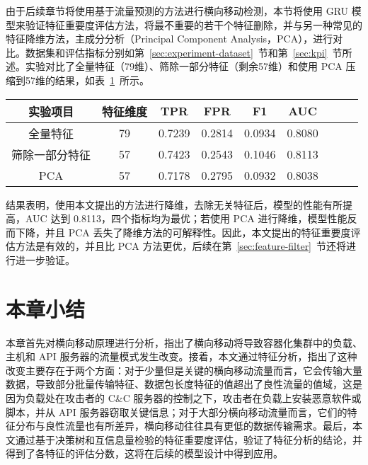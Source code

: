{由于后续章节将使用基于流量预测的方法进行横向移动检测，本节将使用 GRU 模型来验证特征重要度评估方法，将最不重要的若干个特征删除，并与另一种常见的特征降维方法，主成分分析（Principal Component Analysis，PCA），进行对比。数据集和评估指标分别如第~\ref{sec:experiment-dataset}~节和第~\ref{sec:kpi}~节所述。实验对比了全量特征（79维）、筛除一部分特征（剩余57维）和使用 PCA 压缩到57维的结果，如表~\ref{tab:analyze-expreiment-result}~所示。

\begin{table}[!htbp]
    \label{tab:analyze-expreiment-result}
    \centering
    \footnotesize%
    \setlength{\tabcolsep}{4pt}%
    \renewcommand{\arraystretch}{1.2}%
    \begin{tabular}{ccccccccc}
        \hline
        实验项目 & 特征维度 & TPR & FPR & F1 & AUC\\
        \hline
        全量特征 & 79 & 0.7239 & 0.2814 & 0.0934 & 0.8080\\
        筛除一部分特征 & 57 & 0.7423 & 0.2543 & 0.1046 & 0.8113\\
        PCA & 57 & 0.7178 & 0.2795 & 0.0932 & 0.8038\\
        \hline
    \end{tabular}
\end{table}

结果表明，使用本文提出的方法进行降维，去除无关特征后，模型的性能有所提高，AUC 达到 0.8113，四个指标均为最优；若使用 PCA 进行降维，模型性能反而下降，并且 PCA 丢失了降维方法的可解释性。因此，本文提出的特征重要度评估方法是有效的，并且比 PCA 方法更优，后续在第~\ref{sec:feature-filter}~节还将进行进一步验证。

\section{本章小结}

本章首先对横向移动原理进行分析，指出了横向移动将导致容器化集群中的负载、主机和 API 服务器的流量模式发生改变。接着，本文通过特征分析，指出了这种改变主要存在于两个方面：对于少量但是关键的横向移动流量而言，它会传输大量数据，导致部分批量传输特征、数据包长度特征的值超出了良性流量的值域，这是因为负载处在攻击者的 C\&C 服务器的控制之下，攻击者在负载上安装恶意软件或脚本，并从 API 服务器窃取关键信息；对于大部分横向移动流量而言，它们的特征分布与良性流量也有所差异，横向移动往往具有更低的数据传输需求。最后，本文通过基于决策树和互信息量检验的特征重要度评估，验证了特征分析的结论，并得到了各特征的评估分数，这将在后续的模型设计中得到应用。
}
